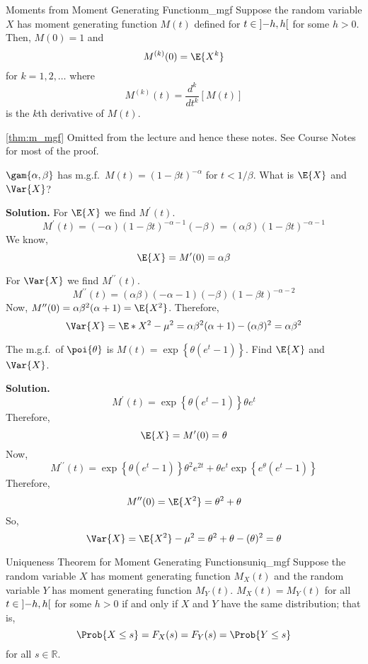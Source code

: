 \begin{Theorem}{Moments from Moment Generating Function}{m_mgf}
    Suppose the random variable $ X $ has moment generating
    function $ M(t) $ defined for $ t\in\interval[open]{-h}{h} $
    for some $ h>0 $. Then, $ M(0)=1 $ and
    \[ M^{(k)}(0)=\E{X^k} \]
    for $ k=1,2,\ldots $ where
    \[ M^{(k)}(t)=\frac{d^k}{dt^k} \left[ M(t) \right] \]
    is the $ k $th derivative of $ M(t) $.
\end{Theorem}
\begin{Proof}{\ref{thm:m_mgf}}{}
    Omitted from the lecture and hence these notes.
    See Course Notes for most of the proof.
\end{Proof}

\begin{Example}{}{}
    $ \gam{\alpha,\beta}$ has m.g.f.\
    $ \displaystyle  M(t)=(1-\beta t)^{-\alpha} $
    for $ t<1/\beta $. What is $ \E{X} $ and $ \Var{X} $?

    \textbf{Solution.} For $ \E{X} $ we find $ M^\prime(t) $.
    \[ M^\prime(t)=(-\alpha)(1-\beta t)^{-\alpha-1}(-\beta)=
        (\alpha \beta)(1-\beta t)^{-\alpha-1} \]
    We know,
    \[ \E{X}=M^\prime(0)=\alpha\beta \]

    For $ \Var{X} $ we find $ M^{\prime\prime}(t) $.
    \[ M^{\prime\prime}(t)=(\alpha\beta)(-\alpha-1)(-\beta)(1-\beta t)^{-\alpha-2} \]
    Now, $ M^{\prime\prime}(0)=\alpha\beta^2(\alpha+1) =\E{X^2} $. Therefore,
    \[ \Var{X}=\E*{X^2}-\mu^2=\alpha\beta^2(\alpha+1)-(\alpha\beta)^2=\alpha\beta^2 \]
\end{Example}

\begin{Example}{}{}
    The m.g.f.\ of $ \poi{\theta} $ is $ \displaystyle  M(t)=\exp\left\{ \theta(e^t-1)\right\} $.
    Find $ \E{X} $ and $ \Var{X} $.

    \textbf{Solution.}
    \[ M^\prime(t)=\exp\left\{ \theta(e^t-1)\right\}\theta e^t \]
    Therefore,
    \[ \E{X}=M^\prime(0)=\theta \]
    Now,
    \[ M^{\prime\prime}(t)=
        \exp\left\{ \theta(e^t-1)\right\}\theta^2 e^{2t}+\theta e^t
        \exp\left\{ e^\theta(e^t-1)\right\} \]
    Therefore,
    \[ M^{\prime\prime}(0)=\E{X^2}=\theta^2+\theta \]
    So,
    \[ \Var{X}=\E{X^2}-\mu^2=\theta^2+\theta-(\theta)^2=\theta \]
\end{Example}

\begin{Theorem}{Uniqueness Theorem for Moment Generating Functions}{uniq_mgf}
    Suppose the random variable $ X $ has moment generating function
    $ M_X(t) $ and the random variable $ Y $ has
    moment generating function $ M_Y(t) $.
    $ M_X(t) = M_Y(t) $ for all $ t\in\interval[open]{-h}{h} $
    for some $ h>0 $ if and only if $ X $ and $ Y $ have the same distribution;
    that is,
    \[ \Prob{X\le s}=F_X(s)=F_Y(s)=\Prob{Y\le s} \]
    for all $ s\in\mathbb{R} $.
\end{Theorem}

